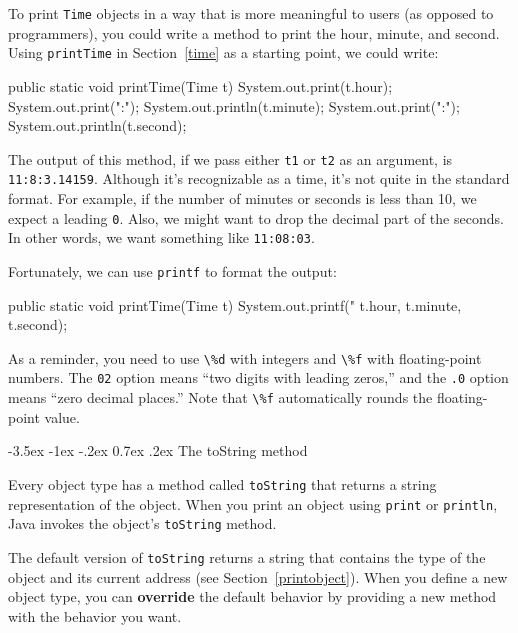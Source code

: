 \documentclass[12pt]{book}
\makeatletter
\theoremstyle{exercise}
\newcommand{\java}[1]{\verb"#1"}
\renewcommand{\section}{\@startsection {section}{1}{\z@}%
    {-3.5ex \@plus -1ex \@minus -.2ex}%
    {0.7ex \@plus.2ex}%
    {\normalfont\Large\bfseries}}
\newcommand{\java}[1]{\lstinline{#1}} %
\makeatother
\begin{document}
To print \java{Time} objects in a way that is more meaningful to users (as opposed to programmers), you could write a method to print the hour, minute, and second.
Using \java{printTime} in Section~\ref{time} as a starting point, we could write:

\begin{code}
    public static void printTime(Time t) {
        System.out.print(t.hour);
        System.out.print(":");
        System.out.println(t.minute);
        System.out.print(":");
        System.out.println(t.second);
    }
\end{code}

The output of this method, if we pass either \java{t1} or \java{t2} as an argument, is {\tt 11:8:3.14159}.
Although it's recognizable as a time, it's not quite in the standard format.
For example, if the number of minutes or seconds is less than 10, we expect a leading {\tt 0}.
Also, we might want to drop the decimal part of the seconds.
In other words, we want something like {\tt 11:08:03}.

Fortunately, we can use \java{printf} to format the output:

\begin{code}
    public static void printTime(Time t) {
        System.out.printf("%
            t.hour, t.minute, t.second);
    }
\end{code}

As a reminder, you need to use \java{\%d} with integers and \java{\%f} with floating-point numbers.
The \java{02} option means ``two digits with leading zeros,'' and the \java{.0} option means ``zero decimal places.''
Note that \java{\%f} automatically rounds the floating-point value.


\section{The toString method}


Every object type has a method called \java{toString} that returns a string representation of the object.
When you print an object using \java{print} or \java{println}, Java invokes the object's \java{toString} method.


The default version of \java{toString} returns a string that contains the type of the object and its current address (see Section~\ref{printobject}).
When you define a new object type, you can {\bf override} the default behavior by providing a new method with the behavior you want.
\end{document}
